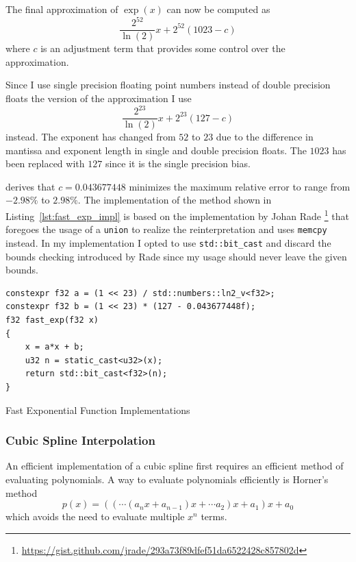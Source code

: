 \documentclass[a4paper, 11pt]{memoir}
\begin{document}
    The final approximation of $\exp{(x)}$ can now be computed as
    \begin{equation}
        \frac{2^{52}}{\ln{(2)}} x + 2^{52}(1023 - c)
    \end{equation}
    where $c$ is an adjustment term that provides some control over the approximation.

    Since I use single precision floating point numbers instead of double precision floats the version of the
    approximation I use
    \begin{equation}
        \frac{2^{23}}{\ln{(2)}}x + 2^{23}(127 - c)
    \end{equation}
    instead. The exponent has changed from $52$ to $23$ due to the difference in mantissa and exponent length in single and
    double precision floats. The $1023$ has been replaced with $127$ since it is the single precision bias.

    \citeauthor{fast_exp} derives that $c = 0.043677448$ minimizes the maximum relative error to range from $-2.98\%$ to
    $2.98\%$. The implementation of the method shown in Listing~\ref{lst:fast_exp_impl} is based on the implementation
    by Johan Rade \footnote{\href{https://gist.github.com/jrade/293a73f89dfef51da6522428c857802d}{https://gist.github.com/jrade/293a73f89dfef51da6522428c857802d}}
    that foregoes the usage of a \texttt{union} to realize the reinterpretation and uses \texttt{memcpy}
    instead. In my implementation I opted to use \texttt{std::bit_cast} and discard the bounds checking
    introduced by Rade since my usage should never leave the given bounds.

    \begin{listing}[H]
        \begin{verbatim}
constexpr f32 a = (1 << 23) / std::numbers::ln2_v<f32>;
constexpr f32 b = (1 << 23) * (127 - 0.043677448f);
f32 fast_exp(f32 x)
{
    x = a*x + b;
    u32 n = static_cast<u32>(x);
    return std::bit_cast<f32>(n);
}
        \end{verbatim}
        \caption{Fast Exponential Function Implementations}
        \label{lst:fast_exp_impl}
    \end{listing}
    
    \subsubsection{Cubic Spline Interpolation}
    \label{sec:impl_cubic_spline}
    An efficient implementation of a cubic spline first requires an efficient method of evaluating polynomials. A way to
    evaluate polynomials efficiently is Horner's method
    \begin{equation}
        p(x) = \left(\left(\cdots\left(a_nx + a_{n-1}\right)x + \cdots a_2\right)x + a_1\right)x + a_0
        \label{eq:horners_method}
    \end{equation}
    which avoids the need to evaluate multiple $x^n$ terms.
\end{document}
